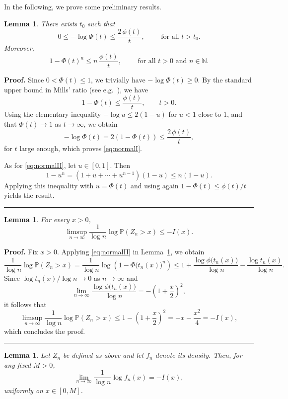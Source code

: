 \documentclass[12pt]{article}%
\newtheorem{lemma}[theorem]{Lemma}
\newenvironment{proof}[1][Proof]{\textbf{#1.} }{\ \rule{0.5em}{0.5em}}
\newcommand{\PP}{\mathbb{P}}
\begin{document}
In the following, we prove some preliminary results.
\begin{lemma}\label{lem:ineqNormal}
There exists $t_0$ such that
\begin{equation}\label{eq:normalI}
0 \le -\log \Phi(t) \le \frac{2\,\phi(t)}{t},
\qquad \mbox{ for all }t>t_0.
\end{equation}
Moreover, 
\begin{equation}\label{eq:normalII}
1-\Phi(t)^n \le n\,\frac{\phi(t)}{t},
\qquad\mbox{ for all }t>0\mbox{ and }n\in\mathbb{N}.
\end{equation}
\end{lemma}

\begin{proof}
Since $0<\Phi(t)\le1$, we trivially have $-\log\Phi(t)\ge0$.
By the standard upper bound in Mills' ratio (see e.g.~\cite[p.~45]{small}), we have
\[
1-\Phi(t)\le \frac{\phi(t)}{t}, \qquad t>0.
\]
 Using the elementary inequality
$-\log u\le 2(1-u)$ for $u<1$ close to $1$, and that  $\Phi(t)\to1$ as $t\to\infty$, we obtain
\[
-\log\Phi(t)
=
2(1-\Phi(t))
\le \frac{2\,\phi(t)}{t},
\]
for $t$ large enough, which proves \eqref{eq:normalI}.

As for \eqref{eq:normalII}, let $u\in[0,1]$. Then
\[
1-u^n=(1+u+\cdots+u^{n-1})(1-u)\le n(1-u).
\]
Applying this inequality with $u=\Phi(t)$ and using again
$1-\Phi(t)\le \phi(t)/t$ yields the result.
\end{proof}


\begin{lemma}\label{lem:limsup}
For every $x>0$,
\[
\limsup_{n\to\infty}\frac{1}{\log n}\log \PP(Z_n>x)\le -I(x).
\]
\end{lemma}

\begin{proof}
Fix $x>0$. 
Applying \eqref{eq:normalII} in  Lemma~\ref{lem:ineqNormal}, we obtain
\[
\frac{1}{\log n}\log\PP(Z_n>x)=\frac{1}{\log n}\log\left(1-\Phi\!\bigl(t_n(x)\bigr)^n \right)
\le
1+\frac{\log\phi\!\bigl(t_n(x)\bigr)}{\log n}
-\frac{\log t_n(x)}{\log n}.
\]
Since $\log t_n(x)/\log n\to0$ as $n\to\infty$ and
\[
\lim_{n\to\infty}\frac{\log\phi\!\bigl(t_n(x)\bigr)}{\log n}
=
-\left(1+\frac{x}{2}\right)^2,
\]
it follows that
\[
\limsup_{n\to\infty}\frac{1}{\log n}\log\PP(Z_n>x)
\le
1-\left(1+\frac{x}{2}\right)^2
=
-x-\frac{x^2}{4}
=
-I(x),
\]
which concludes the proof.
\end{proof}



\begin{lemma}\label{lem:density}
Let $Z_n$ be defined as above and let $f_n$ denote its density.
Then, for any fixed $M>0$,  
\[
\lim_{n\to\infty}\frac{1}{\log n}\log f_n(x)
=
-I(x),
\]
 uniformly on $x\in[0,M]$.
\end{lemma}
\end{document}
